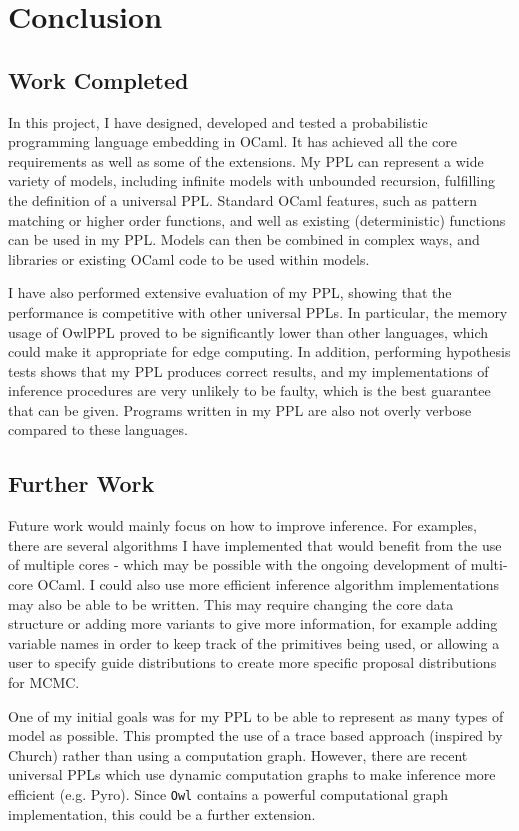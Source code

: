 \chapter{Conclusion}
\vspace{-5mm}
\section{Work Completed}
In this project, I have designed, developed and tested a probabilistic programming language embedding in OCaml. It has achieved all the core requirements as well as some of the extensions. My PPL can represent a wide variety of models, including infinite models with unbounded recursion, fulfilling the definition of a universal PPL. Standard OCaml features, such as pattern matching or higher order functions, and well as existing (deterministic) functions can be used in my PPL. Models can then be combined in complex ways, and libraries or existing OCaml code to be used within models.

I have also performed extensive evaluation of my PPL, showing that the performance is competitive with other universal PPLs. In particular, the memory usage of OwlPPL proved to be significantly lower than other languages, which could make it appropriate for edge computing. In addition, performing hypothesis tests shows that my PPL produces correct results, and my implementations of inference procedures are very unlikely to be faulty, which is the best guarantee that can be given. Programs written in my PPL are also not overly verbose compared to these languages.

\section{Further Work}

Future work would mainly focus on how to improve inference. For examples, there are several algorithms I have implemented that would benefit from the use of multiple cores - which may be possible with the ongoing development of multi-core OCaml. I could also use more efficient inference algorithm implementations may also be able to be written. This may require changing the core data structure or adding more variants to give more information, for example adding variable names in order to keep track of the primitives being used, or allowing a user to specify guide distributions to create more specific proposal distributions for MCMC.

One of my initial goals was for my PPL to be able to represent as many types of model as possible. This prompted the use of a trace based approach (inspired by Church) rather than using a computation graph. However, there are recent universal PPLs which use dynamic computation graphs to make inference more efficient (e.g. Pyro). Since \texttt{Owl} contains a powerful computational graph implementation, this could be a further extension.


